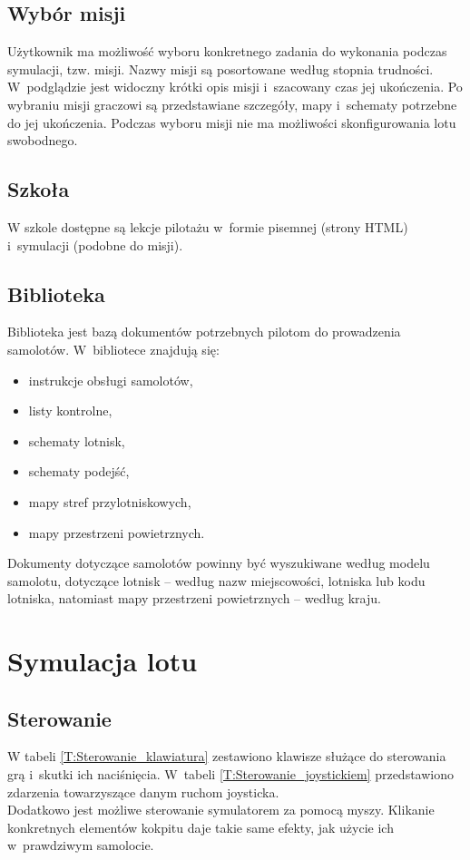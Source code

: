 \documentclass{mwrep}
\begin{document}
\subsection{Wybór misji}

Użytkownik ma możliwość wyboru konkretnego zadania do wykonania podczas symulacji, tzw. misji. Nazwy misji są posortowane według stopnia trudności. W~podglądzie jest widoczny krótki opis misji i~szacowany czas jej ukończenia. Po wybraniu misji graczowi są przedstawiane szczegóły, mapy i~schematy potrzebne do jej ukończenia. Podczas wyboru misji nie ma możliwości skonfigurowania lotu swobodnego.

\subsection{Szkoła}
W szkole dostępne są lekcje pilotażu w~formie pisemnej (strony HTML) i~symulacji (podobne do misji).

\subsection{Biblioteka}
Biblioteka jest bazą dokumentów potrzebnych pilotom do prowadzenia samolotów. W~bibliotece znajdują się:
\begin{itemize}
\item instrukcje obsługi samolotów,
\item listy kontrolne,
\item schematy lotnisk,
\item schematy podejść,
\item mapy stref przylotniskowych,
\item mapy przestrzeni powietrznych.
\end{itemize}

Dokumenty dotyczące samolotów powinny być wyszukiwane według modelu samolotu, dotyczące lotnisk -- według nazw miejscowości, lotniska lub kodu lotniska, natomiast mapy przestrzeni powietrznych -- według kraju.

\section{Symulacja lotu}

\subsection{Sterowanie}

W tabeli \ref{T:Sterowanie_klawiatura} zestawiono klawisze służące do sterowania grą i~skutki ich naciśnięcia. W~tabeli \ref{T:Sterowanie_joystickiem} przedstawiono zdarzenia towarzyszące danym ruchom joysticka.\\
Dodatkowo jest możliwe sterowanie symulatorem za pomocą myszy. Klikanie konkretnych elementów kokpitu daje takie same efekty, jak użycie ich w~prawdziwym samolocie.
\end{document}
